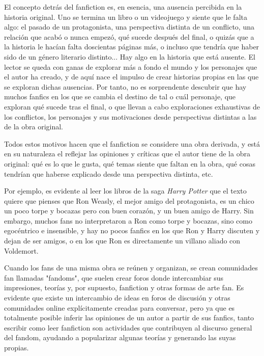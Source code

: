 \documentclass{pre-tfg}
\begin{document}
El concepto detrás del fanfiction es, en esencia, una ausencia percibida en la historia original. Uno se termina un libro o un videojuego y siente que le falta algo: el pasado de un protagonista, una perspectiva distinta de un conflicto, una relación que acabó o nunca empezó, qué sucede después del final, o quizás que a la historia le hacían falta doscientas páginas más, o incluso que tendría que haber sido de un género literario distinto... Hay algo en la historia que está ausente. El lector se queda con ganas de explorar más a fondo el mundo y los personajes que el autor ha creado, y de aquí nace el impulso de crear historias propias en las que se exploran dichas ausencias. Por tanto, no es sorprendente descubrir que hay muchos fanfics en los que se cambia el destino de tal o cuál personaje, que exploran qué sucede tras el final, o que llevan a cabo exploraciones exhaustivas de los conflictos, los personajes y sus motivaciones desde perspectivas distintas a las de la obra original.

Todos estos motivos hacen que el fanfiction se considere una obra derivada\cite{Woosh}, y está en su naturaleza el reflejar las opiniones y críticas que el autor tiene de la obra original: qué es lo que le gusta, qué temas siente que faltan en la obra, qué cosas tendrían que haberse explicado desde una perspectiva distinta, etc.

Por ejemplo, es evidente al leer los libros de la saga \textit{Harry Potter} que el texto quiere que pienses que Ron Weasly, el mejor amigo del protagonista, es un chico un poco torpe y bocazas pero con buen corazón, y un buen amigo de Harry. Sin embargo, muchos fans no interpretaron a Ron como torpe y bocazas, sino como egocéntrico e insensible, y hay no pocos fanfics en los que Ron y Harry discuten y dejan de ser amigos, o en los que Ron es directamente un villano aliado con Voldemort.

Cuando los fans de una misma obra se reúnen y organizan, se crean comunidades fan llamadas "fandoms", que suelen crear foros donde intercambiar sus impresiones, teorías y, por supuesto, fanfiction y otras formas de arte fan. Es evidente que existe un intercambio de ideas en foros de discusión y otras comunidades online explícitamente creadas para conversar, pero ya que es totalmente posible inferir las opiniones de un autor a partir de sus fanfics, tanto escribir como leer fanfiction son actividades que contribuyen al discurso general del fandom, ayudando a popularizar algunas teorías y generando las suyas propias.
\end{document}
